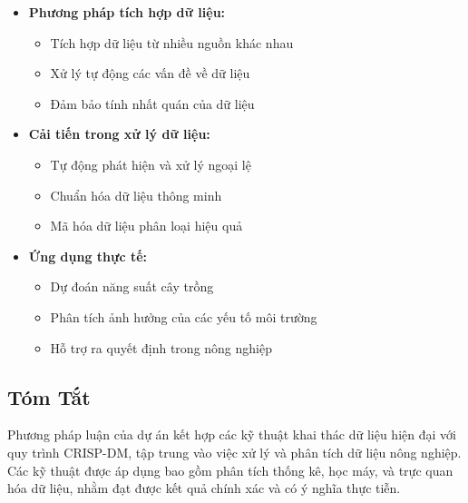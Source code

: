 \begin{itemize}
    \item \textbf{Phương pháp tích hợp dữ liệu:}
    \begin{itemize}
        \item Tích hợp dữ liệu từ nhiều nguồn khác nhau
        \item Xử lý tự động các vấn đề về dữ liệu
        \item Đảm bảo tính nhất quán của dữ liệu
    \end{itemize}
    
    \item \textbf{Cải tiến trong xử lý dữ liệu:}
    \begin{itemize}
        \item Tự động phát hiện và xử lý ngoại lệ
        \item Chuẩn hóa dữ liệu thông minh
        \item Mã hóa dữ liệu phân loại hiệu quả
    \end{itemize}
    
    \item \textbf{Ứng dụng thực tế:}
    \begin{itemize}
        \item Dự đoán năng suất cây trồng
        \item Phân tích ảnh hưởng của các yếu tố môi trường
        \item Hỗ trợ ra quyết định trong nông nghiệp
    \end{itemize}
\end{itemize}

\subsection*{Tóm Tắt}
Phương pháp luận của dự án kết hợp các kỹ thuật khai thác dữ liệu hiện đại với quy trình CRISP-DM, tập trung vào việc xử lý và phân tích dữ liệu nông nghiệp. Các kỹ thuật được áp dụng bao gồm phân tích thống kê, học máy, và trực quan hóa dữ liệu, nhằm đạt được kết quả chính xác và có ý nghĩa thực tiễn. 